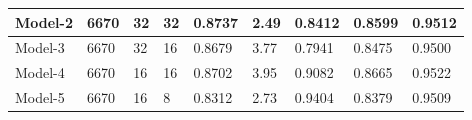 \begin{table}[!htb]
\begin{center}
\begin{tabular}{|l|l|l|l|l|l|l|l|l|}
\textbf{Model-2}                & \textbf{6670}                                                   & \textbf{32}                                                        & \textbf{32}                                                        & \textbf{0.8737}   & \textbf{2.49}                                                     & \textbf{0.8412}      & \textbf{0.8599}                                              & \textbf{0.9512}                                               \\ \hline
Model-3                         & 6670                                                            & 32                                                                 & 16                                                                 & 0.8679            & 3.77                                                              & 0.7941               & 0.8475                                                       & 0.9500                                                        \\ \hline
Model-4                         & 6670                                                            & 16                                                                 & 16                                                                 & 0.8702            & 3.95                                                              & 0.9082               & 0.8665                                                       & 0.9522                                                        \\ \hline
Model-5                         & 6670                                                            & 16                                                                 & 8                                                                  & 0.8312            & 2.73                                                              & 0.9404               & 0.8379                                                       & 0.9509                                                        \\ \hline
\end{tabular}
\end{center}
\end{table}

